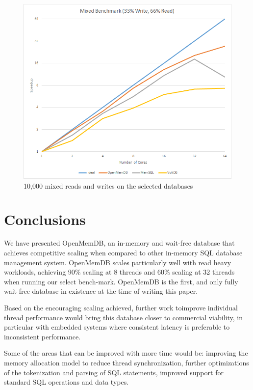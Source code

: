 \documentclass[conference, compsoc]{IEEEtran}
\begin{document}
\begin{figure}[H]
 \begin{center}
   \includegraphics[scale=.35]{MixedBenchmark.png}
  \caption{10,000 mixed reads and writes on the selected databases}
  \label{fig:mixedBenchmark}
   \end{center}
\end{figure}

\section{Conclusions}
We have presented OpenMemDB, an in-memory and wait-free database that achieves competitive scaling when compared to other
in-memory SQL database management system.  OpenMemDB scales particularly well with read heavy workloads, achieving 90\% 
scaling at 8 threads and 60\% scaling at 32 threads when running our select bench-mark. OpenMemDB is the first, and only fully
wait-free database in existence at the time of writing this paper. 
\par\vspace{\baselineskip}
Based on the encouraging scaling achieved, further work toimprove individual thread performance would bring this database
closer to commercial viability, in particular with embedded systems where consistent latency is preferable to inconsistent
performance. 
\par\vspace{\baselineskip}
Some of the areas that can be improved with more time would be: improving the memory allocation model to reduce thread
synchronization, further optimizations of the tokenization and parsing of SQL statements, improved support for standard
SQL operations and data types.

\newpage


\newpage
\end{document}
